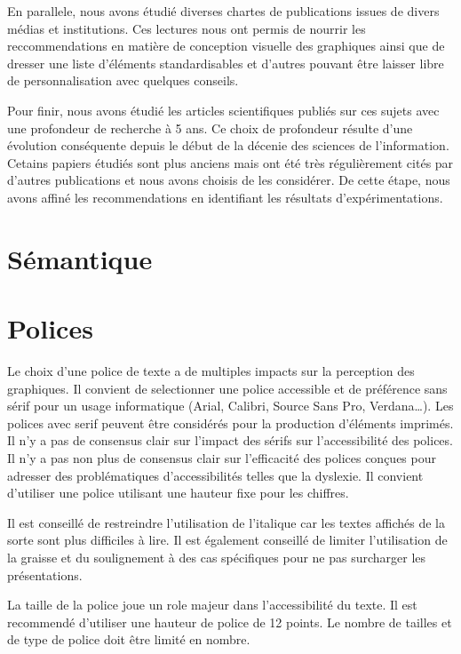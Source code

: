 \documentclass[a4paper,12pt]{article}
\begin{document}
\begin{multicols}{2}
En parallele, nous avons étudié diverses chartes de publications issues de divers médias et institutions. Ces lectures nous ont permis de nourrir les reccommendations en matière de conception visuelle des graphiques ainsi que de dresser une liste d'éléments standardisables et d'autres pouvant être laisser libre de personnalisation avec quelques conseils.

Pour finir, nous avons étudié les articles scientifiques publiés sur ces sujets avec une profondeur de recherche à 5 ans. Ce choix de profondeur résulte d'une évolution conséquente depuis le début de la décenie des sciences de l'information. Cetains papiers étudiés sont plus anciens mais ont été très régulièrement cités par d'autres publications et nous avons choisis de les considérer. De cette étape, nous avons affiné les recommendations en identifiant les résultats d'expérimentations.
\section*{Sémantique}
\label{sec:org691697d}
\section*{Polices}
\label{sec:orgeed7098}
Le choix d'une police de texte a de multiples impacts sur la perception des graphiques. Il convient de selectionner une police accessible et de préférence sans sérif pour un usage informatique (Arial, Calibri, Source Sans Pro, Verdana\ldots{}). \autocite{andreaskrauseBestPracticesData2024} Les polices avec serif peuvent être considérés pour la production d'éléments imprimés. Il n'y a pas de consensus clair sur l'impact des sérifs sur l'accessibilité des polices. \autocite{stephenfewTableDesign2012} Il n'y a pas non plus de consensus clair sur l'efficacité des polices conçues pour adresser des problématiques d'accessibilités telles que la dyslexie. Il convient d'utiliser une police utilisant une hauteur fixe pour les chiffres. \autocite{stephenfewTableDesign2012}

Il est conseillé de restreindre l'utilisation de l'italique car les textes affichés de la sorte sont plus difficiles à lire. Il est également conseillé de limiter l'utilisation de la graisse et du soulignement à des cas spécifiques pour ne pas surcharger les présentations.

La taille de la police joue un role majeur dans l'accessibilité du texte. Il est recommendé d'utiliser une hauteur de police de 12 points.\autocite{andreaskrauseBestPracticesData2024} Le nombre de tailles et de type de police doit être limité en nombre.\autocite{andreaskrauseBestPracticesData2024}


\end{multicols}
\end{document}
